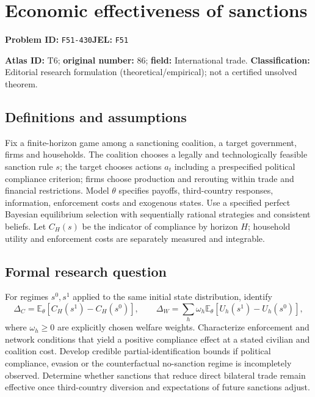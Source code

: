\documentclass[11pt,a4paper]{article}
\begin{document}
\section*{Economic effectiveness of sanctions}
\textbf{Problem ID:} \texttt{F51-430}\quad \textbf{JEL:} \texttt{F51}\par
\label{problem:OP-0086}
\label{atlas:prob:T6}

\noindent\textbf{Atlas ID:} T6; \textbf{original number:} 86; \textbf{field:} International trade. \textbf{Classification:} Editorial research formulation (theoretical/empirical); not a certified unsolved theorem.

\subsection*{Definitions and assumptions}
Fix a finite-horizon game among a sanctioning coalition, a target government, firms and households. The coalition chooses a legally and technologically feasible sanction rule $s$; the target chooses actions $a_t$ including a prespecified political compliance criterion; firms choose production and rerouting within trade and financial restrictions. Model $\theta$ specifies payoffs, third-country responses, information, enforcement costs and exogenous states. Use a specified perfect Bayesian equilibrium selection with sequentially rational strategies and consistent beliefs. Let $C_H(s)$ be the indicator of compliance by horizon $H$; household utility and enforcement costs are separately measured and integrable.

\subsection*{Formal research question}
For regimes $s^0,s^1$ applied to the same initial state distribution, identify
\[
 \Delta_C=\mathbb E_\theta[C_H(s^1)-C_H(s^0)],
 \qquad
 \Delta_W=\sum_h\omega_h\mathbb E_\theta[U_h(s^1)-U_h(s^0)],
\]
where $\omega_h\ge0$ are explicitly chosen welfare weights. Characterize enforcement and network conditions that yield a positive compliance effect at a stated civilian and coalition cost. Develop credible partial-identification bounds if political compliance, evasion or the counterfactual no-sanction regime is incompletely observed. Determine whether sanctions that reduce direct bilateral trade remain effective once third-country diversion and expectations of future sanctions adjust.
\end{document}
